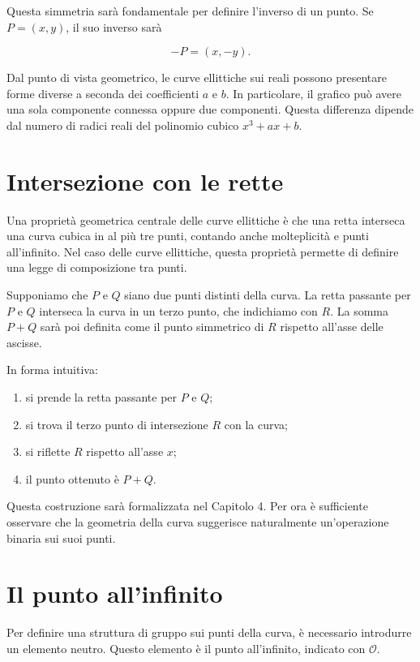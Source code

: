 \documentclass[12pt,a4paper,oneside]{report}
\begin{document}
Questa simmetria sarà fondamentale per definire l'inverso di un punto. Se \(P=(x,y)\), il suo inverso sarà

\begin{equation}
    -P = (x,-y).
\end{equation}

Dal punto di vista geometrico, le curve ellittiche sui reali possono presentare forme diverse a seconda dei coefficienti \(a\) e \(b\). In particolare, il grafico può avere una sola componente connessa oppure due componenti. Questa differenza dipende dal numero di radici reali del polinomio cubico \(x^3+ax+b\).

\section{Intersezione con le rette}

Una proprietà geometrica centrale delle curve ellittiche è che una retta interseca una curva cubica in al più tre punti, contando anche molteplicità e punti all'infinito. Nel caso delle curve ellittiche, questa proprietà permette di definire una legge di composizione tra punti.

Supponiamo che \(P\) e \(Q\) siano due punti distinti della curva. La retta passante per \(P\) e \(Q\) interseca la curva in un terzo punto, che indichiamo con \(R\). La somma \(P+Q\) sarà poi definita come il punto simmetrico di \(R\) rispetto all'asse delle ascisse.

In forma intuitiva:

\begin{enumerate}
    \item si prende la retta passante per \(P\) e \(Q\);
    \item si trova il terzo punto di intersezione \(R\) con la curva;
    \item si riflette \(R\) rispetto all'asse \(x\);
    \item il punto ottenuto è \(P+Q\).
\end{enumerate}

Questa costruzione sarà formalizzata nel Capitolo 4. Per ora è sufficiente osservare che la geometria della curva suggerisce naturalmente un'operazione binaria sui suoi punti.

\section{Il punto all'infinito}

Per definire una struttura di gruppo sui punti della curva, è necessario introdurre un elemento neutro. Questo elemento è il punto all'infinito, indicato con \(\mathcal{O}\).
\end{document}
